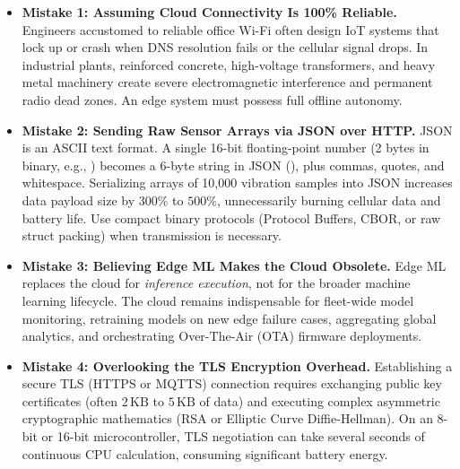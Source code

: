 \begin{warning}
\begin{itemize}
    \item \textbf{Mistake 1: Assuming Cloud Connectivity Is 100\% Reliable.}
    Engineers accustomed to reliable office Wi-Fi often design IoT systems that lock up or crash when DNS resolution fails or the cellular signal drops. In industrial plants, reinforced concrete, high-voltage transformers, and heavy metal machinery create severe electromagnetic interference and permanent radio dead zones. An edge system must possess full offline autonomy.
    \item \textbf{Mistake 2: Sending Raw Sensor Arrays via JSON over HTTP.}
    JSON is an ASCII text format. A single 16-bit floating-point number (2 bytes in binary, e.g., ) becomes a 6-byte string in JSON (), plus commas, quotes, and whitespace. Serializing arrays of 10,000 vibration samples into JSON increases data payload size by $300\%$ to $500\%$, unnecessarily burning cellular data and battery life. Use compact binary protocols (Protocol Buffers, CBOR, or raw struct packing) when transmission is necessary.
    \item \textbf{Mistake 3: Believing Edge ML Makes the Cloud Obsolete.}
    Edge ML replaces the cloud for \emph{inference execution}, not for the broader machine learning lifecycle. The cloud remains indispensable for fleet-wide model monitoring, retraining models on new edge failure cases, aggregating global analytics, and orchestrating Over-The-Air (OTA) firmware deployments.
    \item \textbf{Mistake 4: Overlooking the TLS Encryption Overhead.}
    Establishing a secure TLS (HTTPS or MQTTS) connection requires exchanging public key certificates (often $2\,\text{KB}$ to $5\,\text{KB}$ of data) and executing complex asymmetric cryptographic mathematics (RSA or Elliptic Curve Diffie-Hellman). On an 8-bit or 16-bit microcontroller, TLS negotiation can take several seconds of continuous CPU calculation, consuming significant battery energy.
\end{itemize}
\end{warning}


